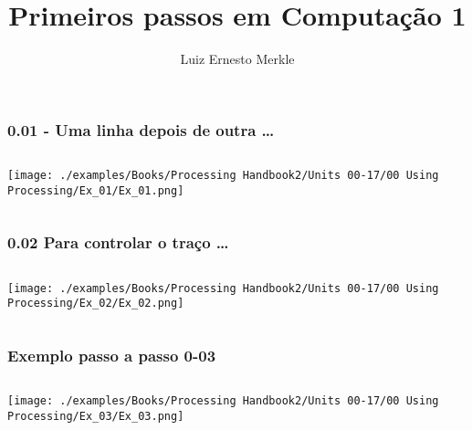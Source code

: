 \documentclass{beamer}
\begin{document}
\title{Primeiros passos em Computação 1}  

\author{Luiz Ernesto Merkle}
\date{} 

\begin{frame}
\titlepage
\end{frame}

\begin{frame}[fragile]
\frametitle{0.01 - Uma linha depois de outra \dots }
  \begin{columns}[T]
    \begin{column}{.3\textwidth}
    \texttt{[image: ./examples/Books/Processing Handbook2/Units 00-17/00 Using Processing/Ex\_01/Ex\_01.png]}
    \end{column}
    \begin{column}{.7\textwidth}
      
    \end{column}
  \end{columns}
\end{frame}

\begin{frame}[fragile]
\frametitle{0.02 Para controlar o traço \dots}
  \begin{columns}[T]
    \begin{column}{.4\textwidth}
    \texttt{[image: ./examples/Books/Processing Handbook2/Units 00-17/00 Using Processing/Ex\_02/Ex\_02.png]}
    \end{column}
    \begin{column}{.6\textwidth}
      
    \end{column}
  \end{columns}
\end{frame}


\begin{frame}[fragile]
\frametitle{Exemplo passo a passo 0-03}
  \begin{columns}[T]
    \begin{column}{.4\textwidth}
    \texttt{[image: ./examples/Books/Processing Handbook2/Units 00-17/00 Using Processing/Ex\_03/Ex\_03.png]}
    \end{column}
    \begin{column}{.6\textwidth}
      
    \end{column}
  \end{columns}
\end{frame}
\end{document}
